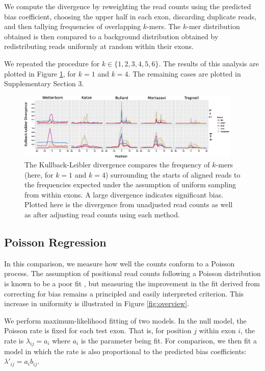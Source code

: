 \documentclass{bioinfo}
\begin{document}
We compute the divergence by reweighting the read counts using the predicted
bias coefficient, choosing the upper half in each exon, discarding duplicate
reads, and then tallying frequencies of overlapping $k$-mers. The $k$-mer
distribution obtained is then compared to a background distribution obtained by
redistributing reads uniformly at random within their exons.

We repeated the procedure for $k \in \{1, 2, 3, 4, 5, 6\}$. The results of this
analysis are plotted in Figure \ref{fig:kl}, for $k = 1$ and $k = 4$. The
remaining cases are plotted in Supplementary Section 3.

\begin{figure}
\centerline{\includegraphics[width=0.95\textwidth]{kl.eps}}
\caption{The Kullback-Leibler divergence compares the frequency of $k$-mers
(here, for $k = 1$ and $k = 4$) surrounding the starts of aligned reads to the
frequencies expected under the assumption of uniform sampling from within exons.
A large divergence indicates significant bias. Plotted here is the divergence
from unadjusted read counts as well as after adjusting read counts using each
method.}
\label{fig:kl}
\end{figure}


\subsection{Poisson Regression}

In this comparison, we measure how well the counts conform to a Poisson process.
The assumption of positional read counts following a Poisson distribution is
known to be a poor fit \citep{Srivastava2010}, but measuring the improvement in
the fit derived from correcting for bias remains a principled and easily
interpreted criterion. This increase in uniformity is illustrated in Figure
\ref{fig:overview}.

We perform maximum-likelihood fitting of two models. In the null model, the
Poisson rate is fixed for each test exon. That is, for position $j$ within exon $i$,
the rate is $ \lambda_{ij} = a_i $ where $a_i$ is the parameter being fit. For
comparison, we then fit a model in which the rate is also proportional to the
predicted bias coefficients: $ \lambda'_{ij} = a_i b_{ij} $.
\end{document}
